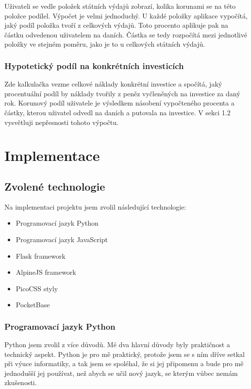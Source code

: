 \documentclass[11pt,a4paper,twoside,openright]{report}
\begin{document}
Uživateli se vedle položek státních výdajů zobrazí, kolika korunami se na této položce podílel.
Výpočet je velmi jednoduchý. U každé položky aplikace vypočítá, jaký podíl položka tvoří
z celkových výdajů. Toto procento aplikuje pak na částku odvedenou uživatelem na daních.
Částka se tedy rozpočítá mezi jednotlivé položky ve stejném poměru, jako je to u
celkových státních výdajů.

\subsection{Hypotetický podíl na konkrétních investicích}

Zde kalkulačka vezme celkové náklady konkrétní investice a spočítá, jaký procentuální podíl
by náklady tvořily z peněz vyčleněných na investice za daný rok. Korunový podíl uživatele
je výsledkem násobení vypočteného procenta a částky, kterou uživatel odvedl na daních a
putovala na investice. V sekci 1.2 vysvětluji nepřesnosti tohoto výpočtu.

\chapter{Implementace}

\section{Zvolené technologie}
Na implementaci projektu jsem zvolil následující technologie:

\begin{itemize}
  \item Programovací jazyk Python
  \item Programovací jazyk JavaScript
  \item Flask framework
  \item AlpineJS framework
  \item PicoCSS styly
  \item PocketBase
\end{itemize}

\subsection{Programovací jazyk Python}
Python jsem zvolil z více důvodů. Mé dva hlavní důvody byly praktičnost a technický aspekt. Python je
pro mě praktický, protože jsem se s ním dříve setkal při výuce informatiky, a tak jsem se spoléhal, že
si jej připomenu a bude pro mě jednodušší  jej používat, než abych se učil nový jazyk, se kterým vůbec nemám
zkušenosti.
\end{document}
